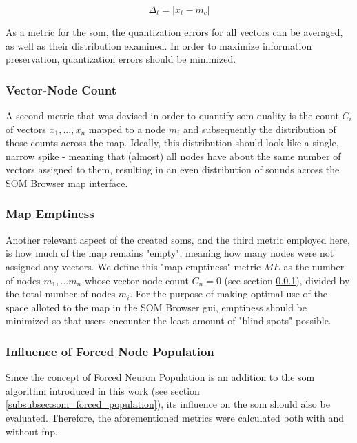 \begin{equation}
  \Delta_t = | x_t - m_c |
\end{equation}

As a metric for the \gls{som}, the quantization errors for all vectors can be
averaged, as well as their distribution examined. In order to maximize
information preservation, quantization errors should be minimized.

\subsubsection{Vector-Node Count}
\label{subsubsec:vector_node_count}
A second metric that was devised in order to quantify \gls{som} quality is the
count $ C_i $ of vectors $ x_1, ... , x_n $ mapped to a node $ m_i $ and
subsequently the distribution of those counts across the map. Ideally, this
distribution should look like a single, narrow spike - meaning that (almost) all
nodes have about the same number of vectors assigned to them, resulting in an
even distribution of sounds across the SOM Browser map interface.

\subsubsection{Map Emptiness}
\label{subsubsec:map_emptiness}
Another relevant aspect of the created \glspl{som}, and the third metric
employed here, is how much of the map remains "empty", meaning how many nodes
were not assigned any vectors. We define this "map emptiness" metric $ ME $ as
the number of nodes $ m_1, ... m_n $ whose vector-node count $ C_n = 0 $ (see
section \ref{subsubsec:vector_node_count}), divided by the total number of nodes
$ m_i $. For the purpose of making optimal use of the space alloted to the map
in the SOM Browser \gls{gui}, emptiness should be minimized so that users
encounter the least amount of "blind spots" possible.

\subsubsection{Influence of Forced Node Population}
\label{subsubsec:eval_fnp_influence}
Since the concept of Forced Neuron Population is an addition to the \gls{som}
algorithm introduced in this work (see section
\ref{subsubsec:som_forced_population}), its influence on the \gls{som} should
also be evaluated. Therefore, the aforementioned metrics were calculated
both with and without \gls{fnp}.

